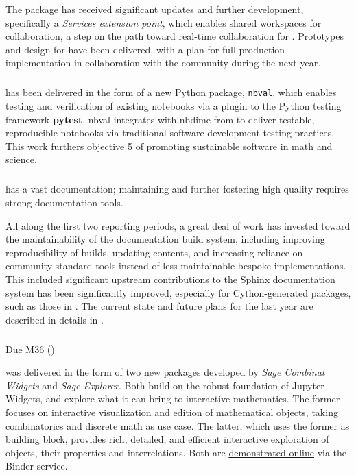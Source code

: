 The \JupyterHub package has received significant updates and further development, specifically a
\emph{Services extension point}, which enables shared workspaces for collaboration, a step on the path
toward real-time collaboration for .
Prototypes and design for  have been delivered,
with a plan for full production implementation in collaboration with the \Jupyter community during the next year.

\subparagraph{}

 has been delivered in the form of a new Python package, \texttt{nbval},
which enables testing and verification of existing notebooks via a plugin to the Python testing
framework \textbf{pytest}. nbval integrates with nbdime from  to deliver
testable, reproducible notebooks via traditional software development testing practices.
This work furthers \ODK objective 5 of promoting sustainable software in math and science.

\subparagraph{}
\label{UI@sage-sphinx}

\Sage has a vast documentation; maintaining and further fostering high
quality requires strong documentation tools.

All along the first two reporting periods, a great deal of work has
invested toward the maintainability of the \Sage documentation build
system, including improving reproducibility of builds, updating
contents, and increasing reliance on community-standard tools instead
of less maintainable bespoke implementations. This included
significant upstream contributions to the Sphinx documentation system
has been significantly improved, especially for Cython-generated
packages, such as those in . The current state
and future plans for the last year are described in details in
.

\subparagraph{} Due M36 ()

 was delivered in the
form of two new packages developed by \ODK \emph{Sage Combinat
  Widgets} and \emph{Sage Explorer}. Both build on the robust
foundation of Jupyter Widgets, and explore what it can bring to
interactive mathematics. The former focuses on interactive
visualization and edition of mathematical objects, taking
combinatorics and discrete math as use case. The latter, which uses
the former as building block, provides rich, detailed, and efficient
interactive exploration of objects, their properties and
interrelations. Both are
\href{https://github.com/sagemath/sage-explorer}{demonstrated online}
via the Binder service.

